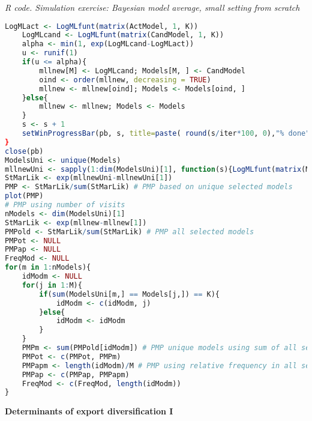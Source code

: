 \begin{tcolorbox}[enhanced,width=4.67in,center upper,
	fontupper=\large\bfseries,drop shadow southwest,sharp corners]
	\textit{R code. Simulation exercise: Bayesian model average, small setting from scratch}
	\begin{VF}
		\begin{lstlisting}[language=R]
	LogMLact <- LogMLfunt(matrix(ActModel, 1, K))
	LogMLcand <- LogMLfunt(matrix(CandModel, 1, K))
	alpha <- min(1, exp(LogMLcand-LogMLact))
	u <- runif(1)
	if(u <= alpha){
		mllnew[M] <- LogMLcand; Models[M, ] <- CandModel
		oind <- order(mllnew, decreasing = TRUE)
		mllnew <- mllnew[oind]; Models <- Models[oind, ]
	}else{
		mllnew <- mllnew; Models <- Models
	}
	s <- s + 1
	setWinProgressBar(pb, s, title=paste( round(s/iter*100, 0),"% done"))
}
close(pb)
ModelsUni <- unique(Models)
mllnewUni <- sapply(1:dim(ModelsUni)[1], function(s){LogMLfunt(matrix(ModelsUni[s,], 1, K))})
StMarLik <- exp(mllnewUni-mllnewUni[1])
PMP <- StMarLik/sum(StMarLik) # PMP based on unique selected models
plot(PMP)
# PMP using number of visits
nModels <- dim(ModelsUni)[1]
StMarLik <- exp(mllnew-mllnew[1])
PMPold <- StMarLik/sum(StMarLik) # PMP all selected models
PMPot <- NULL
PMPap <- NULL
FreqMod <- NULL
for(m in 1:nModels){
	idModm <- NULL
	for(j in 1:M){
		if(sum(ModelsUni[m,] == Models[j,]) == K){
			idModm <- c(idModm, j)
		}else{
			idModm <- idModm
		}
	}
	PMPm <- sum(PMPold[idModm]) # PMP unique models using sum of all selected models
	PMPot <- c(PMPot, PMPm)
	PMPapm <- length(idModm)/M # PMP using relative frequency in all selected models
	PMPap <- c(PMPap, PMPapm)
	FreqMod <- c(FreqMod, length(idModm))
}
\end{lstlisting}
	\end{VF}
\end{tcolorbox} 
 


\textbf{Determinants of export diversification I}




